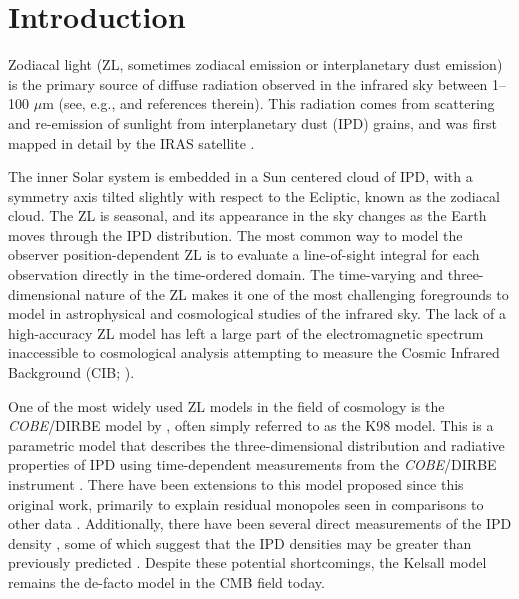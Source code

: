 \documentclass[twocolumn]{aa}
\begin{document}

   \maketitle

\setcounter{tocdepth}{2}
\tableofcontents
   

\section{Introduction}
Zodiacal light (ZL, sometimes zodiacal emission or interplanetary dust
emission) is the primary source of diffuse radiation observed in the
infrared sky between 1--100 $\mu$m (see, e.g., \citealp{Leinert1998}
and references therein). This radiation comes from scattering and
re-emission of sunlight from interplanetary dust (IPD) grains, and was
first mapped in detail by the IRAS satellite
\citep{neugebauer:1984}.

The inner Solar system is embedded in a Sun centered cloud of IPD,
with a symmetry axis tilted slightly with respect to the Ecliptic,
known as the zodiacal cloud. The ZL is seasonal, and its appearance in
the sky changes as the Earth moves through the IPD distribution. The
most common way to model the observer position-dependent ZL is to
evaluate a line-of-sight integral for each observation directly in the
time-ordered domain. The time-varying and three-dimensional nature of
the ZL makes it one of the most challenging foregrounds to model in
astrophysical and cosmological studies of the infrared sky. The lack
of a high-accuracy ZL model has left a large part of the
electromagnetic spectrum inaccessible to cosmological analysis
attempting to measure the Cosmic Infrared Background (CIB;
\citealp{partridge1967,hauser1998,hauser:2001}).

One of the most widely used ZL models in the field of cosmology is the
\textit{COBE}/DIRBE model by \citet{Kelsall1998}, often simply
referred to as the K98 model. This is a parametric model that describes 
the three-dimensional distribution and radiative 
properties of IPD using time-dependent measurements from
the \textit{COBE}/DIRBE instrument \citep{hauser1998}. There have been extensions to this model proposed since this original work, primarily to explain residual monopoles seen in comparisons to other data \citep{sano, Korngut,  skysurf}. Additionally, there have been several direct measurements of the IPD density \citep{newhorizons, parker}, some of which suggest that the IPD densities may be greater than previously predicted \citep{pioneer}. Despite these potential shortcomings, the Kelsall model remains the de-facto model in the CMB field today.
\end{document}
